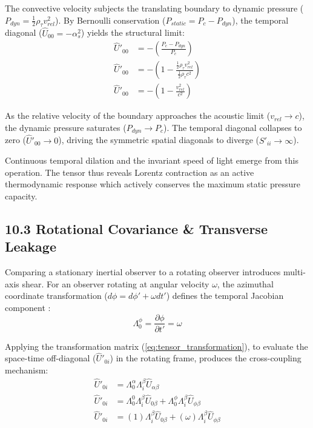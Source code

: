 The convective velocity subjects the translating boundary to dynamic pressure ($P_{dyn} = \frac{1}{2}\rho_\tau v_{rel}^2$). 
By Bernoulli conservation \cite{Landau1987} ($P_{static} = P_c - P_{dyn}$), the temporal diagonal ($\hat{U}_{00} = -\alpha_s^2$) yields the structural limit:
\begin{align}
    \hat{U}'_{00} &= - \left( \frac{P_c - P_{dyn}}{P_c} \right) \nonumber \\
    \hat{U}'_{00} &= - \left( 1 - \frac{\frac{1}{2}\rho_\tau v_{rel}^2}{\frac{1}{2}\rho_\tau c^2} \right) \nonumber \\
    \hat{U}'_{00} &= - \left( 1 - \frac{v_{rel}^2}{c^2} \right) \label{eq:covar_temporal_diagonal}
\end{align}

As the relative velocity of the boundary approaches the acoustic limit ($v_{rel} \to c$), the dynamic pressure saturates ($P_{dyn} \to P_c$). The temporal diagonal collapses to zero ($\hat{U}'_{00} \to 0$), driving the symmetric spatial diagonals to diverge ($S'_{ii} \to \infty$). 

Continuous temporal dilation and the invariant speed of light emerge from this operation. The tensor thus reveals Lorentz contraction as an active thermodynamic response which actively conserves the maximum static pressure capacity.

\subsection*{10.3 Rotational Covariance \& Transverse Leakage}
Comparing a stationary inertial observer to a rotating observer introduces multi-axis shear. For an observer rotating at angular velocity $\omega$, the azimuthal coordinate transformation ($d\phi = d\phi' + \omega dt'$) defines the temporal Jacobian component \cite{Landau1971}:
\begin{equation}
    \Lambda^\phi_0 = \frac{\partial \phi}{\partial t'} = \omega
\end{equation}

Applying the transformation matrix (\ref{eq:tensor_transformation}), to evaluate the space-time off-diagonal ($\hat{U}'_{0i}$) in the rotating frame, produces the cross-coupling mechanism: 
\begin{align}
    \hat{U}'_{0i} &= \Lambda^\alpha_0 \Lambda^\beta_i \hat{U}_{\alpha\beta} \nonumber \\
    \hat{U}'_{0i} &= \Lambda^0_0 \Lambda^\beta_i \hat{U}_{0\beta} + \Lambda^\phi_0 \Lambda^\beta_i \hat{U}_{\phi\beta} \nonumber \\
    \hat{U}'_{0i} &= (1)\Lambda^\beta_i \hat{U}_{0\beta} + (\omega)\Lambda^\beta_i \hat{U}_{\phi\beta} \label{eq:covar_rotational_leakage}
\end{align}

